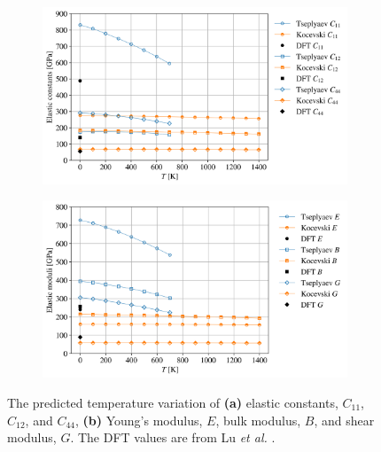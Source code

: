 \documentclass[preprint, 12pt]{elsarticle}
\begin{document}
\begin{figure}[h!]
\centering
\begin{subfigure}{0.45\textwidth}
    \includegraphics[width=\textwidth]{ElasticConstantsUN2.png}
    \caption{}
    \label{Fig:ElasConstUN2}
\end{subfigure}
\hfill
\begin{subfigure}{0.45\textwidth}
    \includegraphics[width=\textwidth]{ElasticModuliUN2.png}
    \caption{}
    \label{Fig:ElasModUN2}
\end{subfigure}
\hfill
\caption{The predicted temperature variation of \textbf{(a)}  elastic constants, $C_{11}$, $C_{12}$, and $C_{44}$, \textbf{(b)}  Young's modulus, $E$, bulk modulus, $B$, and shear modulus, $G$. The DFT values are from Lu \textit{et al.} \cite{Lu2011}.}
\label{Fig:ECUN2}
\end{figure}
\end{document}
